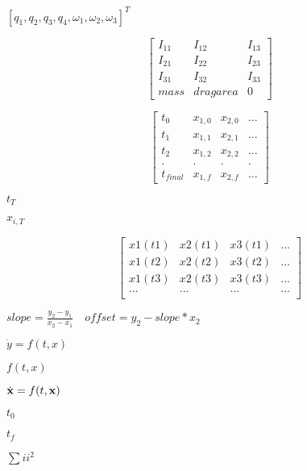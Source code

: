 \documentclass{article}
\begin{document}
$[q_1, q_2, q_3, q_4, \omega_1, \omega_2, \omega_3]^{T}$
\pagebreak

\[\begin{bmatrix} I_{11} & I_{12} & I_{13} \\ I_{21} & I_{22} & I_{23} \\ I_{31} & I_{32} & I_{33} \\ mass & drag area & 0 \end{bmatrix}\]
\pagebreak

\[ \begin{bmatrix} t_0 & x_{1,0} & x_{2,0} & ...\\ t_1 & x_{1,1} & x_{2,1} & ...\\ t_2 & x_{1,2} & x_{2,2} & ...\\ . & . & . & . \\ t_{final} & x_{1,f} & x_{2,f} & ... \end{bmatrix} \]
\pagebreak

$t_T$
\pagebreak

$x_{i,T}$
\pagebreak

\[\begin{bmatrix} x1(t1) & x2(t1) & x3(t1) & ... \\ x1(t2) & x2(t2) & x3(t2)& ... \\ x1(t3) & x2(t3) & x3(t3) & ... \\ ... & ... & ... & ... \\ \end{bmatrix}\]
\pagebreak

$ slope=\frac{y_2 - y_1}{x_2-x_1}\quad offset=y_2-slope * x_2 $
\pagebreak

$\dot{y} = f\left(t,x\right)$
\pagebreak

$f\left(t,x\right)$
\pagebreak

$\dot{\bf x} = f(t,{\bf x})$
\pagebreak

$t_0$
\pagebreak

$t_f$
\pagebreak

$\sum{ii^2}$
\pagebreak
\end{document}
